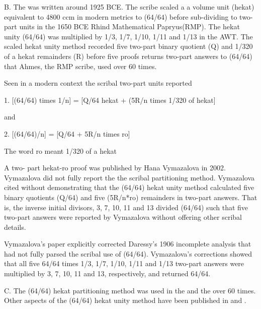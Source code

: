\documentclass[12pt]{article}
\begin{document}
B. The was written around 1925 BCE. The scribe scaled a a volume unit (hekat) equivalent to 4800 ccm in modern metrics to (64/64) before sub-dividing to two-part units in the 1650 BCE Rhind Mathematical Papryus(RMP). The hekat unity (64/64) was multiplied by 1/3, 1/7, 1/10, 1/11 and 1/13 in the AWT. The scaled hekat unity method recorded five two-part binary quotient (Q) and 1/320 of a hekat remainders (R) before five proofs returns two-part answers to (64/64) that Ahmes, the RMP scribe, used over 60 times.

Seen in a modern context the scribal two-part units reported

1. [(64/64) times 1/n] = [Q/64 hekat + (5R/n times 1/320 of hekat] 

and

2. [(64/64)/n] = [Q/64 + 5R/n times ro]    

The word ro  meant 1/320 of a hekat

A two- part hekat-ro proof was published by Hana Vymazalova in 2002. Vymazalova did not fully report the the scribal partitioning method. Vymazalova cited without demonstrating that the (64/64) hekat unity method calculated five binary quotients (Q/64) and five (5R/n*ro) remainders in two-part answers. That is, the inverse initial divisors, 3, 7, 10, 11 and 13 divided (64/64) such that five two-part answers were reported by Vymazalova without offering other scribal details.

Vymazalova's paper explicitly corrected Daressy's 1906 incomplete analysis that had not fully parsed the scribal use of (64/64). Vymazalova's corrections showed that all five 64/64 times 1/3, 1/7, 1/10, 1/11 and 1/13 two-part answers were multiplied by 3, 7, 10, 11 and 13, respectively, and returned 64/64.    

C. The (64/64) hekat partitioning method was used in the  and the  over 60 times. Other aspects of the (64/64) hekat unity method have been published in  and .
\end{document}
